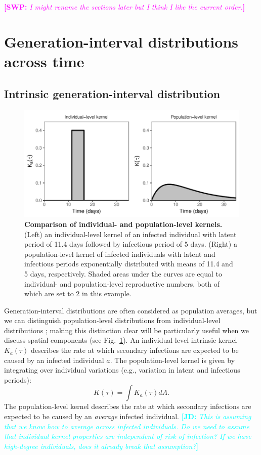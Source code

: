 \documentclass[12pt]{article}
\newcommand{\fref}[1]{Fig.~\ref{fig:#1}}
\newcommand{\comment}[3]{\textcolor{#1}{\textbf{[#2: }\textsl{#3}\textbf{]}}}
\newcommand{\jd}[1]{\comment{cyan}{JD}{#1}}
\newcommand{\swp}[1]{\comment{magenta}{SWP}{#1}}
\begin{document}
\swp{I might rename the sections later but I think I like the current order.}
\section{Generation-interval distributions across time}

\subsection{Intrinsic generation-interval distribution}

\begin{figure}[t]
\includegraphics[width=\textwidth]{../fig/individual_and_population.pdf}
\caption{\textbf{Comparison of individual- and population-level kernels.}
(Left) an individual-level kernel of an infected individual with latent period of 11.4 days followed by infectious period of 5 days. 
(Right) a population-level kernel of infected individuals with latent and infectious periods exponentially distributed with means of 11.4 and 5 days, respectively. 
Shaded areas under the curves are equal to individual- and population-level reproductive numbers, both of which are set to 2 in this example.
}
\label{fig:indpop}

\end{figure}

Generation-interval distributions are often considered as population averages, but we can distinguish population-level distributions from individual-level distributions \citep{svensson2007note, svensson2015influence}; 
making this distinction clear will be particularly useful when we discuss spatial components (see \fref{indpop}).
An individual-level intrinsic kernel $K_a(\tau)$ describes the rate at which secondary infections are expected to be caused by an infected individual $a$.
The population-level kernel is given by integrating over individual variations (e.g., variation in latent and infectious periods):
\begin{equation}
K(\tau) = \int K_a (\tau) dA.
\end{equation}
The population-level kernel describes the rate at which secondary infections are expected to be caused by an \emph{average} infected individual.
\jd{This is assuming that we know how to average across infected individuals. Do we need to assume that individual kernel properties are independent of risk of infection? If we have high-degree individuals, does it already break that assumption?}
\end{document}
